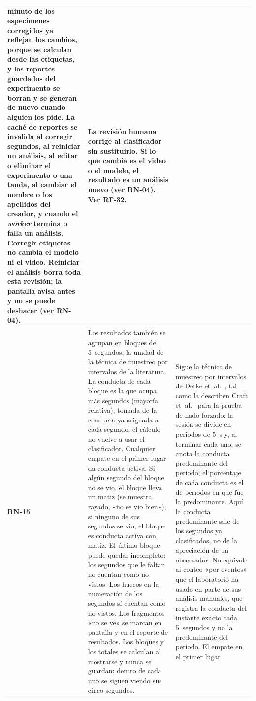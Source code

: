 \begin{longtable}{|>{\bfseries}p{1.1cm}|>{\raggedright}p{8.1cm}|>{\raggedright\arraybackslash}p{3.9cm}|}
        minuto de los especímenes corregidos ya reflejan los cambios, porque se
        calculan desde las etiquetas, y los reportes guardados del experimento se
        borran y se generan de nuevo cuando alguien los pide. La caché de reportes se invalida al corregir segundos, al
        reiniciar un análisis, al editar o eliminar el experimento o una tanda, al cambiar el nombre o los apellidos del
        creador, y cuando el \textit{worker} termina o falla un análisis.
        Corregir etiquetas no cambia el modelo ni el video. Reiniciar el análisis
        borra toda esta revisión; la pantalla avisa antes y no se puede deshacer
        (ver RN-04).
      & La revisión humana corrige al clasificador sin sustituirlo. Si lo que cambia
        es el video o el modelo, el resultado es un análisis nuevo (ver RN-04).
        Ver RF-32. \\
\hline
RN-15 & Los resultados también se agrupan en bloques de 5~segundos, la unidad de la
        técnica de muestreo por intervalos de la literatura. La conducta de cada bloque es la que ocupa más segundos
        (mayoría relativa), tomada de la conducta ya asignada a cada segundo; el cálculo
        no vuelve a usar el clasificador. Cualquier empate en el primer lugar da
        conducta activa. Si algún segundo del bloque no se vio, el bloque lleva un
        matiz (se muestra rayado, «no se vio bien»); si ninguno de sus segundos se vio,
        el bloque es conducta activa con matiz. El último bloque puede quedar
        incompleto: los segundos que le faltan no cuentan como no vistos. Los huecos en
        la numeración de los segundos sí cuentan como no vistos. Los fragmentos «no se
        ve» se marcan en pantalla y en el reporte de resultados. Los bloques y los
        totales se calculan al mostrarse y nunca se guardan; dentro de cada
        uno se siguen viendo sus cinco segundos.
      & Sigue la técnica de muestreo por intervalos de Detke et~al.\ \cite{detke1995},
        tal como la describen Craft et~al.\ \cite{craft2010} para la prueba de nado
        forzado: la sesión se divide en periodos de 5~s y, al terminar
        cada uno, se anota la conducta predominante del periodo; el porcentaje de
        cada conducta es el de periodos en que fue la predominante. Aquí la conducta
        predominante sale de los segundos ya clasificados, no de la apreciación de un
        observador. No equivale al conteo «por eventos» que el laboratorio ha usado en
        parte de sus análisis manuales, que registra la conducta del instante exacto
        cada 5~segundos y no la predominante del periodo. El empate en el primer lugar

\end{longtable}

